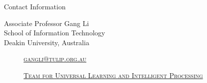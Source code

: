 \documentclass[
 size=14pt,
 paper=smartboard,  %
 mode=present, 		%
 display=slides, 	%
 style=tuliplab,  	%
 pauseslide,
 fleqn,leqno]{powerdot}
\begin{document}
\begin{wideslide}[toc=,bm=]{Contact Information}
\centering
{}
\twocolumn[
lcolwidth=0.35\linewidth,
rcolwidth=0.65\linewidth
]
{
}
{
Associate Professor Gang Li\\
School of Information Technology\\
Deakin University, Australia
\begin{description}
 \item[\textcolor{orange}{\faEnvelope}] \href{mailto:gangli@tulip.org.au}
 {\textsc{\footnotesize{gangli@tulip.org.au}}}

 \item[\textcolor{orange}{\faHome}] \href{http://www.tulip.org.au}
 {\textsc{\footnotesize{Team for Universal Learning and Intelligent Processing}}}
\end{description}
}
\end{wideslide}
\end{document}
